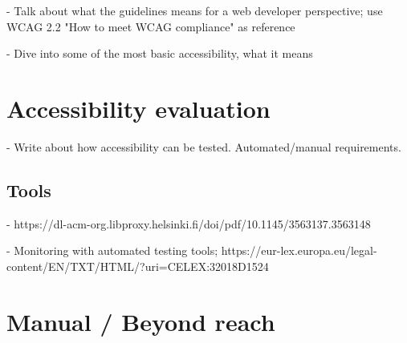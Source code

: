 - Talk about what the guidelines means for a web developer perspective; use WCAG 2.2 "How to meet WCAG compliance" as reference

- Dive into some of the most basic accessibility, what it means
\section{Accessibility evaluation}

- Write about how accessibility can be tested. Automated/manual requirements.

\subsection{Tools}

- https://dl-acm-org.libproxy.helsinki.fi/doi/pdf/10.1145/3563137.3563148

- Monitoring with automated testing tools; https://eur-lex.europa.eu/legal-content/EN/TXT/HTML/?uri=CELEX:32018D1524

\section{Manual / Beyond reach}